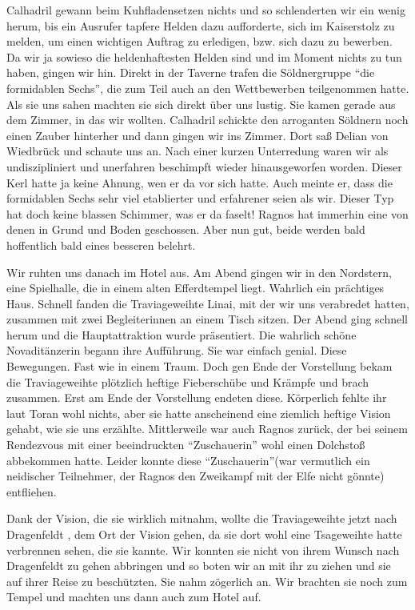 Calhadril gewann beim Kuhfladensetzen nichts und so schlenderten wir ein wenig herum, bis ein Ausrufer tapfere Helden dazu aufforderte, sich im Kaiserstolz zu melden, um einen wichtigen Auftrag zu erledigen, bzw. sich dazu zu bewerben. Da wir ja sowieso die heldenhaftesten Helden sind und im Moment nichts zu tun haben, gingen wir hin. Direkt in der Taverne trafen die Söldnergruppe ``die formidablen Sechs'', die zum Teil auch an den Wettbewerben teilgenommen hatte. Als sie uns sahen machten sie sich direkt über uns lustig. Sie kamen gerade aus dem Zimmer, in das wir wollten. Calhadril schickte den arroganten Söldnern noch einen Zauber hinterher und dann gingen wir ins Zimmer. Dort saß Delian von Wiedbrück und schaute uns an. Nach einer kurzen Unterredung waren wir als undiszipliniert und unerfahren beschimpft wieder hinausgeworfen worden. Dieser Kerl hatte ja keine Ahnung, wen er da vor sich hatte. Auch meinte er, dass die formidablen Sechs sehr viel etablierter und erfahrener seien als wir. Dieser Typ hat doch keine blassen Schimmer, was er da faselt! Ragnos hat immerhin eine von denen in Grund und Boden geschossen. Aber nun gut, beide werden bald hoffentlich bald eines besseren belehrt. 


Wir ruhten uns danach im Hotel aus. Am Abend gingen wir in den Nordstern, eine Spielhalle, die in einem alten Efferdtempel liegt. Wahrlich ein prächtiges Haus. Schnell fanden die Traviageweihte Linai, mit der wir uns verabredet hatten, zusammen mit zwei Begleiterinnen an einem Tisch sitzen. Der Abend ging schnell herum und die Hauptattraktion wurde präsentiert. Die wahrlich schöne Novaditänzerin begann ihre Aufführung. Sie war einfach genial. Diese Bewegungen. Fast wie in einem Traum. Doch gen Ende der Vorstellung bekam die Traviageweihte plötzlich heftige Fieberschübe und Krämpfe und brach zusammen. Erst am Ende der Vorstellung endeten diese. Körperlich fehlte ihr laut Toran wohl nichts, aber sie hatte anscheinend eine ziemlich heftige Vision gehabt, wie sie uns erzählte. Mittlerweile war auch Ragnos zurück, der bei seinem Rendezvous mit einer beeindruckten ``Zuschauerin'' wohl einen Dolchstoß abbekommen hatte. Leider konnte diese ``Zuschauerin''(war vermutlich ein neidischer Teilnehmer, der Ragnos den Zweikampf mit der Elfe nicht gönnte) entfliehen. 


Dank der Vision, die sie wirklich mitnahm, wollte die Traviageweihte jetzt nach Dragenfeldt , dem Ort der Vision gehen, da sie dort wohl eine Tsageweihte hatte verbrennen sehen, die sie kannte. Wir konnten sie nicht von ihrem Wunsch nach Dragenfeldt zu gehen abbringen und so boten wir an mit ihr zu ziehen und sie auf ihrer Reise zu beschützten. Sie nahm zögerlich an. Wir brachten sie noch zum Tempel und machten uns dann auch zum Hotel auf.

